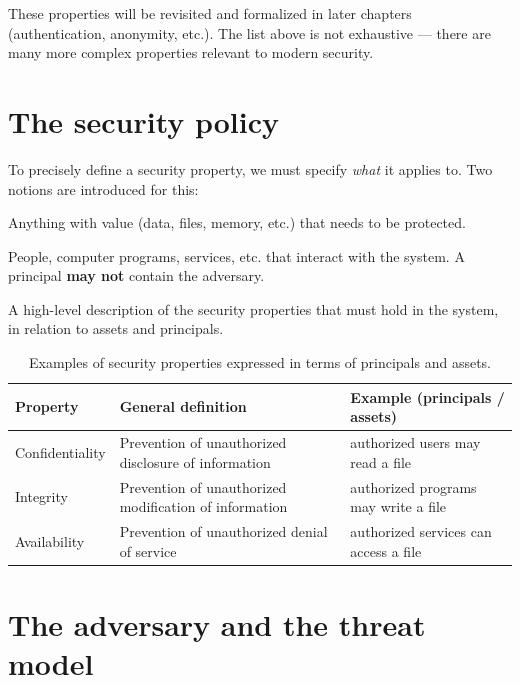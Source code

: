 \begin{remark}
These properties will be revisited and formalized in later chapters (authentication, anonymity, etc.). The list above is not exhaustive — there are many more complex properties relevant to modern security.
\end{remark}

\section{The security policy}

To precisely define a security property, we must specify \emph{what} it applies to. Two notions are introduced for this:

\begin{definition}
Anything with value (data, files, memory, etc.) that needs to be protected.
\end{definition}

\begin{definition}
People, computer programs, services, etc. that interact with the system. A principal \textbf{may not} contain the adversary.
\end{definition}

\begin{definition}
A high-level description of the security properties that must hold in the system, in relation to assets and principals.
\end{definition}

\begin{table}[h]
\centering
\begin{tabular}{@{}p{2.7cm}p{5cm}p{5cm}@{}}
\toprule
\textbf{Property} & \textbf{General definition} & \textbf{Example (principals / assets)} \\
\midrule
Confidentiality & Prevention of unauthorized disclosure of information & authorized users may read a file \\
Integrity & Prevention of unauthorized modification of information & authorized programs may write a file \\
Availability & Prevention of unauthorized denial of service & authorized services can access a file \\
\bottomrule
\end{tabular}
\caption{Examples of security properties expressed in terms of principals and assets.}
\end{table}

\section{The adversary and the threat model}


